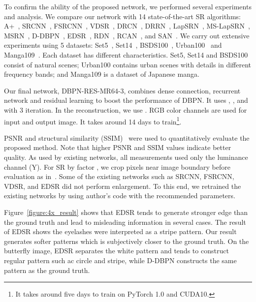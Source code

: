 \documentclass[10pt,journal,compsoc]{IEEEtran}
\begin{document}
To confirm the ability of the proposed network, we performed several experiments and analysis. We compare our network with 14 state-of-the-art SR algorithms: A+~\cite{timofte2014a+}, SRCNN~\cite{dong2016image}, FSRCNN~\cite{dong2016accelerating}, VDSR~\cite{Kim_2016_VDSR}, DRCN~\cite{kim2016deeply}, DRRN~\cite{Tai-DRRN-2017}, 
LapSRN~\cite{LapSRN}, MS-LapSRN~\cite{lai2018fast}, MSRN~\cite{li2018multi}, D-DBPN~\cite{haris2018deep}, EDSR~\cite{Lim_2017_CVPR_Workshops}, RDN~\cite{zhang2018residual}, RCAN~\cite{zhang2018image}, and SAN~\cite{dai2019second}. We carry out extensive experiments using 5 datasets: Set5~\cite{bevilacqua2012low}, Set14~\cite{zeyde2012single}, BSDS100~\cite{arbelaez2011contour}, Urban100~\cite{huang2015single} and Manga109~\cite{matsui2016sketch}. Each dataset has different characteristics. Set5, Set14 and BSDS100 consist of natural scenes; Urban100 contains urban scenes with details in different frequency bands; and Manga109 is a dataset of Japanese manga. 

Our final network, DBPN-RES-MR64-3, combines dense connection, recurrent network and residual learning to boost the performance of DBPN. It uses , , and  with 3 iteration. In the reconstruction, we use . RGB color channels are used for input and output image. It takes around 14 days to train\footnote{It takes around five days to train on PyTorch 1.0 and CUDA10.}.

PSNR and structural similarity (SSIM)~\cite{wang04}
were used to quantitatively evaluate the proposed method. Note that higher PSNR
and SSIM values indicate better quality. As used by existing networks,
all measurements used only the luminance channel (Y). For SR by factor
, we crop  pixels near image boundary before evaluation as in~\cite{Lim_2017_CVPR_Workshops, dong2016accelerating}. Some of the existing networks such as SRCNN, FSRCNN, VDSR, and EDSR did not perform  enlargement. To this end, we retrained the existing networks by using author's code with the recommended parameters. 

Figure~\ref{figure:4x_result} shows that EDSR tends to generate stronger edge than the ground truth and lead to misleading information in several cases. The result of EDSR shows the eyelashes were interpreted as a stripe pattern. Our result generates softer patterns which is subjectively closer to the ground truth. On the butterfly image, EDSR separates the white pattern and tends to construct regular pattern such ac circle and stripe, while D-DBPN constructs the same pattern as the ground truth. 
\end{document}
